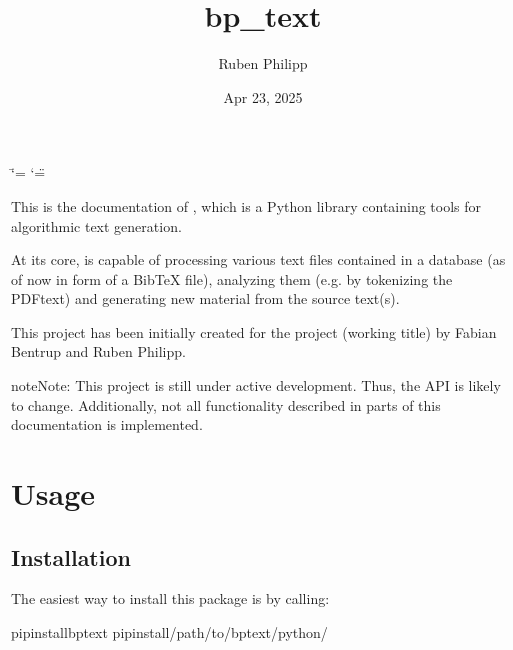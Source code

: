 \documentclass[letterpaper,10pt,english]{sphinxmanual}
\title{bp\_text}
\date{Apr 23, 2025}
\author{Ruben Philipp}
\begin{document}
\ifdefined\shorthandoff
  \ifnum\catcode`\=\string=\active\shorthandoff{=}\fi
  \ifnum\catcode`\"=\active{}\fi
\fi

\pagestyle{empty}
\sphinxmaketitle
\pagestyle{plain}
\sphinxtableofcontents
\pagestyle{normal}
\label{\detokenize{index::doc}}


\sphinxAtStartPar
This is the documentation of , which is a Python library containing
tools for algorithmic text generation.

\sphinxAtStartPar
At its core,  is capable of processing various text files contained
in a database (as of now in form of a BibTeX file), analyzing them (e.g. by
tokenizing the PDF\sphinxhyphen{}text) and generating new material from the source text(s).

\sphinxAtStartPar
This project has been initially created for the project  (working title) by Fabian Bentrup and Ruben Philipp.

\begin{sphinxadmonition}{note}{Note:}
\sphinxAtStartPar
This project is still under active development.  Thus, the API is likely to
change.  Additionally, not all functionality described in parts of this
documentation is implemented.
\end{sphinxadmonition}

\sphinxstepscope


\chapter{Usage}
\label{\detokenize{usage:usage}}\label{\detokenize{usage::doc}}

\section{Installation}
\label{\detokenize{usage:installation}}
\sphinxAtStartPar
The easiest way to install this package is by calling:

\begin{sphinxVerbatim}[commandchars=\\\{\}]
pipinstallbp\PYGZus{}text
pipinstall/path/to/bp\PYGZhy{}text/python/
\end{sphinxVerbatim}

\sphinxstepscope
\end{document}
